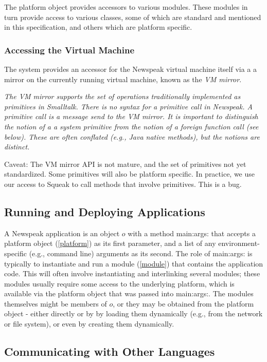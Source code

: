 \documentclass{article}
\newcommand{\code}[1]{{\sf #1}}
\begin{document}
The platform object provides accessors to various modules.  These modules in turn provide access to various classes, some of which are standard and mentioned in this specification, and others which are platform specific.


\subsubsection{Accessing the Virtual Machine}
\label{vm}

The system provides an accessor for the Newspeak virtual machine itself via a
a mirror on the currently running virtual machine, known as the {\em VM mirror}. 

{\it 
The VM mirror supports the set of operations traditionally implemented as primitives in Smalltalk. There is no syntax for a primitive call in Newspeak. A primitive call is a message send to the VM mirror.
It is important to distinguish the notion of a a system primitive from the notion of a foreign function call (see below). These are often conflated (e.g., Java native methods), but the notions are distinct.

Caveat: The VM mirror API is not mature, and the set of primitives not yet standardized. Some primitives will also be platform specific. In practice, we use our access to Squeak to call methods that involve primitives. This is a bug.
}

\subsection{Running and Deploying Applications}
\label{deploy}

A Newspeak application is an object $o$ with a method \code{main:args:} that accepts a platform object (\ref{platform})  as its first parameter, and a list of any environment-specific (e.g., command line) arguments as its second.  The role of \code{main:args:} is typically to instantiate and run a module  (\ref{module}) that contains the application code. This will often involve instantiating and interlinking several modules; these modules usually require some access to the underlying platform, which is available via the platform object that was passed into \code{main:args:}. The modules themselves might be members of $o$, or they may be obtained from the platform object - either directly or by by loading them dynamically  (e.g., from the network or file system), or even by creating them dynamically.


\subsection{Communicating with Other Languages}
\label{aliens}
\end{document}
